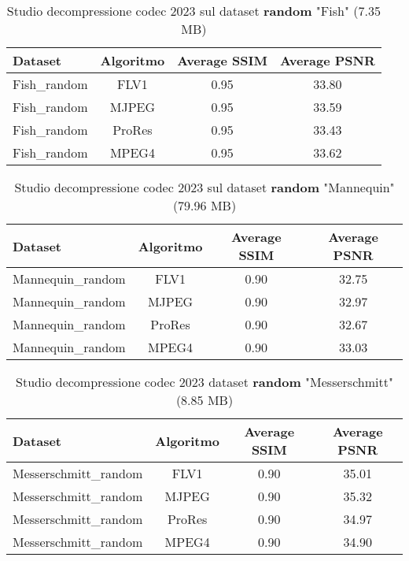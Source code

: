 \begin{table}[!ht]
\centering
\begin{tabular}{|l|c|c|c|}
\hline
Dataset               & Algoritmo & Average SSIM & Average PSNR \\ \hline
Fish\_random          & FLV1      & 0.95        & 33.80       \\ \hline
Fish\_random          & MJPEG     & 0.95        & 33.59       \\ \hline
Fish\_random          & ProRes    & 0.95        & 33.43       \\ \hline
Fish\_random          & MPEG4     & 0.95        & 33.62       \\ \hline
\end{tabular}
\caption{Studio decompressione codec 2023 sul dataset \textbf{random} "Fish" (7.35 MB)}
\end{table}

\begin{table}[!ht]
\centering
\begin{tabular}{|l|c|c|c|}
\hline
Dataset               & Algoritmo & Average SSIM & Average PSNR \\ \hline
Mannequin\_random     & FLV1      & 0.90        & 32.75       \\ \hline
Mannequin\_random     & MJPEG     & 0.90        & 32.97       \\ \hline
Mannequin\_random     & ProRes    & 0.90        & 32.67       \\ \hline
Mannequin\_random     & MPEG4     & 0.90        & 33.03       \\ \hline
\end{tabular}
\caption{Studio decompressione codec 2023 sul dataset \textbf{random} "Mannequin" (79.96 MB)}
\end{table}

\begin{table}[!ht]
\centering
\begin{tabular}{|l|c|c|c|}
\hline
Dataset               & Algoritmo & Average SSIM & Average PSNR \\ \hline
Messerschmitt\_random & FLV1      & 0.90        & 35.01       \\ \hline
Messerschmitt\_random & MJPEG     & 0.90        & 35.32       \\ \hline
Messerschmitt\_random & ProRes    & 0.90        & 34.97       \\ \hline
Messerschmitt\_random & MPEG4     & 0.90        & 34.90       \\ \hline
\end{tabular}
\caption{Studio decompressione codec 2023 dataset \textbf{random} "Messerschmitt" (8.85 MB)}
\end{table}

